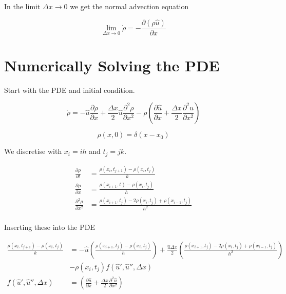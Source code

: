 \documentclass[a4paper]{article}
\begin{document}
In the limit $\Delta x \rightarrow 0$ we get the normal advection equation 

\begin{equation}
\lim _{\Delta x \rightarrow 0} \dot{\rho}  = - \frac{\partial (\rho \hat{u} )}{\partial x}
\end{equation}

\newpage

\section{Numerically Solving the PDE}

Start with the PDE and initial condition. 

\begin{equation}
\dot{\rho} = - \hat{u} \frac{\partial \rho}{\partial x} + \frac{\Delta x}{2} \hat{u} \frac{\partial ^2 \rho}{\partial x ^2} - \rho \left( \frac{\partial \hat{u}}{\partial x} + \frac{\Delta x }{2} \frac{\partial ^2 \hat{u}}{\partial x^2} \right) 
\end{equation}

\begin{equation}
\rho ( x, 0) = \delta (x - x _0 ) 
\end{equation}

We discretise with $x_i = i h $ and $t_j = jk$. 

\begin{align*}
\frac{\partial \rho}{\partial t} & = \frac{\rho ( x_i , t_{j+1}) - \rho (x _i , t_j )}{k} \\
\frac{\partial \rho}{\partial x} & = \frac{\rho ( x_{i + 1} , t_{}) - \rho (x _i , t_j )}{h} \\
\frac{\partial ^2 \rho}{\partial x ^2} & = \frac{\rho (x_{i+1} , t_j ) - 2 \rho ( x _i, t _j ) + \rho (x_{i-1} , t_j ) }{h ^2} \\
\end{align*}

Inserting these into the PDE

\begin{align*}
\frac{\rho ( x_i , t_{j+1}) - \rho (x _i , t_j )}{k} & = - \hat{u} \left(  \frac{\rho ( x_{i + 1} , t_{j}) - \rho (x _i , t_j )}{h} \right) + \frac{\hat{u} \Delta x}{2} \left( \frac{\rho (x_{i+1} , t_j ) - 2 \rho ( x _i, t _j ) + \rho (x_{i-1} , t_j ) }{h ^2} \right)  \\
& - \rho ( x _i , t_j ) f( \hat{u} ' , \hat{u} '' , \Delta x ) \\
f( \hat{u} ' , \hat{u} '' , \Delta x ) & = \left( \frac{\partial \hat{u}}{\partial x} + \frac{\Delta x }{2} \frac{\partial ^2 \hat{u}}{\partial x^2} \right) 
\end{align*}
\end{document}

